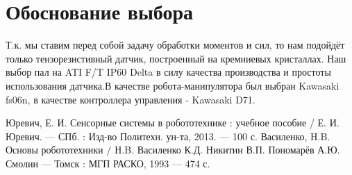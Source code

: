 \documentclass[a4paper,14pt,russian]{extreport} \usepackage{extsizes}
\begin{document}
	\section {Обоснование выбора}
	Т.к. мы ставим перед собой задачу обработки моментов и сил, то
	нам подойдёт только тензорезистивный датчик, построенный на кремниевых кристаллах. Наш выбор пал на ATI F/T IP60 Delta в силу качества производства и простоты использования датчика.В качестве робота-манипулятора был выбран Kawasaki fs06n, в качестве контроллера управления - Kawasaki D71.
	\newpage
	\begin{thebibliography}{99}
	Юревич, Е. И. Сенсорные системы в робототехнике : учебное пособие / Е. И. Юревич. — СПб. : Изд-во Политехн. ун-та, 2013. — 100 с.	
	 Василенко, H.B. Основы робототехники / H.B. Василенко К.Д. Никитин В.П. Пономарёв А.Ю. Смолин — Томск : МГП  РАСКО, 1993 — 474 с.	
	\end{thebibliography}	
\end{document}
